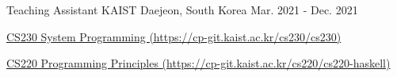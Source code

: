 

\begin{cventries}


  \cventry
    {Teaching Assistant} %
    {KAIST} %
    {Daejeon, South Korea} %
    {Mar. 2021 - Dec. 2021} %
    {
      \begin{cvitems} %
        \item \href{https://cp-git.kaist.ac.kr/cs230/cs230}{CS230 System Programming (https://cp-git.kaist.ac.kr/cs230/cs230)}
        \item \href{https://cp-git.kaist.ac.kr/cs220/cs220-haskell}{CS220 Programming Principles (https://cp-git.kaist.ac.kr/cs220/cs220-haskell)}
      \end{cvitems}
    }


\end{cventries}
